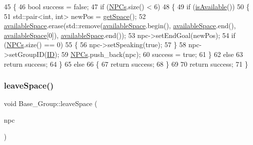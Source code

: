 \begin{DoxyCode}
45 \{
46     \textcolor{keywordtype}{bool} success = \textcolor{keyword}{false};
47     \textcolor{keywordflow}{if} (\hyperlink{class_base___group_a4757f3c06c73eea029f71b871c1d863e}{NPCs}.size() < 6)
48     \{
49         \textcolor{keywordflow}{if} (\hyperlink{class_base___group_a6d806401632aa9f7795984bb2b4880f0}{isAvailable}())
50         \{
51             std::pair<int, int> newPos = \hyperlink{class_base___group_a4f6559c7a35e04e6355454df2e3be3b2}{getSpace}();
52             \hyperlink{class_base___group_a8eb46d3107d53da0f5fbea2410b4b095}{availableSpace}.erase(std::remove(\hyperlink{class_base___group_a8eb46d3107d53da0f5fbea2410b4b095}{availableSpace}.begin(), 
      \hyperlink{class_base___group_a8eb46d3107d53da0f5fbea2410b4b095}{availableSpace}.end(), \hyperlink{class_base___group_a8eb46d3107d53da0f5fbea2410b4b095}{availableSpace}[0]), 
      \hyperlink{class_base___group_a8eb46d3107d53da0f5fbea2410b4b095}{availableSpace}.end());
53             npc->setEndGoal(newPos);
54             \textcolor{keywordflow}{if} (\hyperlink{class_base___group_a4757f3c06c73eea029f71b871c1d863e}{NPCs}.size() == 0)
55             \{
56                 npc->setSpeaking(\textcolor{keyword}{true});
57             \}
58             npc->setGroupID(\hyperlink{class_base___group_ae6ea7525642b45edafb56589d9945f90}{ID});
59             \hyperlink{class_base___group_a4757f3c06c73eea029f71b871c1d863e}{NPCs}.push\_back(npc);
60             success = \textcolor{keyword}{true};
61         \}
62         \textcolor{keywordflow}{else}
63             \textcolor{keywordflow}{return} success;
64     \}
65     \textcolor{keywordflow}{else}
66     \{
67         \textcolor{keywordflow}{return} success;
68     \}
69 
70     \textcolor{keywordflow}{return} success;
71 \}
\end{DoxyCode}
\mbox{\label{class_base___group_a0928f2c23abc827f6d387a5597324f6e}} 
\subsubsection{\texorpdfstring{leave\+Space()}{leaveSpace()}}
{\footnotesize\ttfamily void Base\+\_\+\+Group\+::leave\+Space (\begin{DoxyParamCaption}\item[{std\+::shared\+\_\+ptr$<$ \hyperlink{class_n_p_c}{N\+PC} $>$}]{npc }\end{DoxyParamCaption})}



